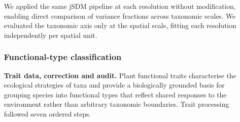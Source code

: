 \documentclass[
  12pt,
]{article}
\begin{document}
We applied the same jSDM pipeline at each resolution without
modification, enabling direct comparison of variance fractions across
taxonomic scales. We evaluated the taxonomic axis only at the spatial
scale, fitting each resolution independently per spatial unit.

\subsubsection{Functional-type
classification}\label{functional-type-classification}

\textbf{Trait data, correction and audit.} Plant functional traits
characterise the ecological strategies of taxa and provide a
biologically grounded basis for grouping species into functional types
that reflect shared responses to the environment rather than arbitrary
taxonomic boundaries. Trait processing followed seven ordered steps.
\end{document}
